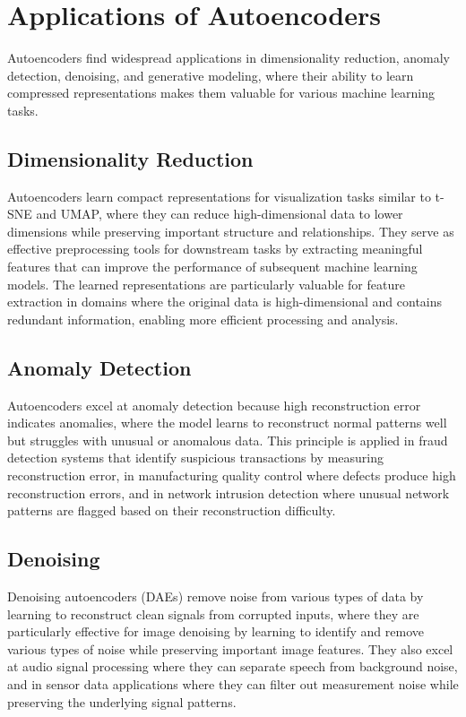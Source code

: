 
\section{Applications of Autoencoders }
\label{sec:ae-applications}

Autoencoders find widespread applications in dimensionality reduction, anomaly detection, denoising, and generative modeling, where their ability to learn compressed representations makes them valuable for various machine learning tasks.

\subsection{Dimensionality Reduction}

Autoencoders learn compact representations for visualization tasks similar to t-SNE and UMAP, where they can reduce high-dimensional data to lower dimensions while preserving important structure and relationships. They serve as effective preprocessing tools for downstream tasks by extracting meaningful features that can improve the performance of subsequent machine learning models. The learned representations are particularly valuable for feature extraction in domains where the original data is high-dimensional and contains redundant information, enabling more efficient processing and analysis.

\subsection{Anomaly Detection}

Autoencoders excel at anomaly detection because high reconstruction error indicates anomalies, where the model learns to reconstruct normal patterns well but struggles with unusual or anomalous data. This principle is applied in fraud detection systems that identify suspicious transactions by measuring reconstruction error, in manufacturing quality control where defects produce high reconstruction errors, and in network intrusion detection where unusual network patterns are flagged based on their reconstruction difficulty.

\subsection{Denoising}

Denoising autoencoders (DAEs) remove noise from various types of data by learning to reconstruct clean signals from corrupted inputs, where they are particularly effective for image denoising by learning to identify and remove various types of noise while preserving important image features. They also excel at audio signal processing where they can separate speech from background noise, and in sensor data applications where they can filter out measurement noise while preserving the underlying signal patterns.


